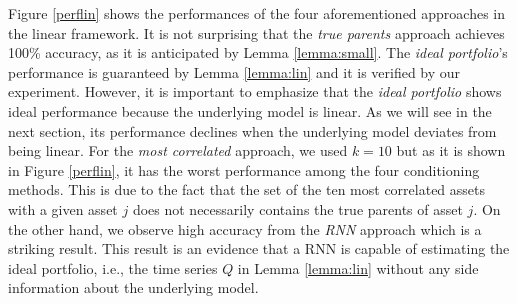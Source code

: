     
Figure \ref{perflin} shows the performances of the four aforementioned approaches in the linear framework. 
It is not surprising that the \textit{true parents} approach achieves 100\% accuracy, as it is anticipated by Lemma \ref{lemma:small}.
The \textit{ideal portfolio}'s performance is guaranteed by Lemma \ref{lemma:lin} and it is verified by our experiment.
However, it is important to emphasize that the \textit{ideal portfolio} shows ideal performance because the underlying model is linear. 
As we will see in the next section, its performance declines when the underlying model deviates from being linear. 
For the \textit{most correlated} approach, we used $k=10$ but as it is shown in Figure \ref{perflin}, it has the worst performance among the four conditioning methods. 
This is due to the fact that the set of the ten most correlated assets with a given asset $j$ does not necessarily contains the true parents of asset $j$.
On the other hand, we observe high accuracy from the \textit{RNN} approach which is a striking result.
This result is an evidence that a RNN is capable of estimating the ideal portfolio, i.e., the time series $Q$ in Lemma \ref{lemma:lin} without any side information about the underlying model. 


